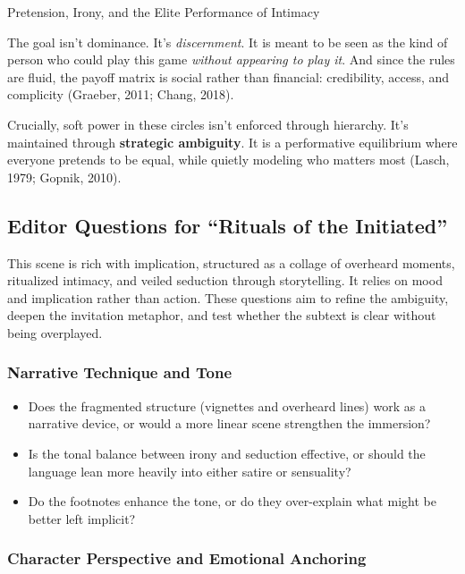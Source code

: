 \begin{HistoricalSidebar}{Pretension, Irony, and the Elite Performance of Intimacy}
  \medskip
  
  The goal isn’t dominance. It’s \emph{discernment}. It is meant to be seen as the kind of person who could 
  play this game \textit{without appearing to play it}. And since the rules are fluid, the payoff matrix 
  is social rather than financial: credibility, access, and complicity (Graeber, 2011; Chang, 2018).
  
  \medskip
  
  Crucially, soft power in these circles isn’t enforced through hierarchy. It’s maintained through 
  \textbf{strategic ambiguity}. It is a performative equilibrium where everyone pretends to be equal, 
  while quietly modeling who matters most (Lasch, 1979; Gopnik, 2010).


\end{HistoricalSidebar}



\subsection*{Editor Questions for ``Rituals of the Initiated''}

This scene is rich with implication, structured as a collage of overheard moments, ritualized intimacy, and veiled seduction through storytelling. It relies on mood and implication rather than action. These questions aim to refine the ambiguity, deepen the invitation metaphor, and test whether the subtext is clear without being overplayed.

\subsubsection*{Narrative Technique and Tone}

\begin{itemize}
  \item Does the fragmented structure (vignettes and overheard lines) work as a narrative device, or would a more linear scene strengthen the immersion?
  \item Is the tonal balance between irony and seduction effective, or should the language lean more heavily into either satire or sensuality?
  \item Do the footnotes enhance the tone, or do they over-explain what might be better left implicit?
\end{itemize}

\subsubsection*{Character Perspective and Emotional Anchoring}

